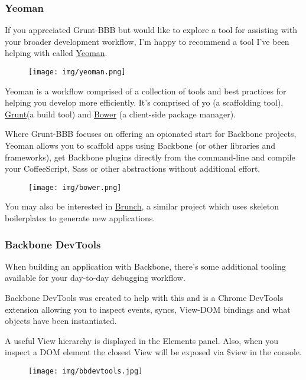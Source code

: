 \documentclass[9pt]{book}
\begin{document}
\subsubsection{Yeoman}\label{yeoman}

If you appreciated Grunt-BBB but would like to explore a tool for
assisting with your broader development workflow, I'm happy to recommend
a tool I've been helping with called \href{http://yeoman.io}{Yeoman}.

\begin{figure}[htbp]
\centering
\texttt{[image: img/yeoman.png]}
\end{figure}

Yeoman is a workflow comprised of a collection of tools and best
practices for helping you develop more efficiently. It's comprised of yo
(a scaffolding tool), \href{http://gruntjs.com}{Grunt}(a build tool) and
\href{http://bower.io}{Bower} (a client-side package manager).

Where Grunt-BBB focuses on offering an opionated start for Backbone
projects, Yeoman allows you to scaffold apps using Backbone (or other
libraries and frameworks), get Backbone plugins directly from the
command-line and compile your CoffeeScript, Sass or other abstractions
without additional effort.

\begin{figure}[htbp]
\centering
\texttt{[image: img/bower.png]}
\end{figure}

You may also be interested in \href{http://brunch.io/}{Brunch}, a
similar project which uses skeleton boilerplates to generate new
applications.

\subsubsection{Backbone DevTools}\label{backbone-devtools}

When building an application with Backbone, there's some additional
tooling available for your day-to-day debugging workflow.

Backbone DevTools was created to help with this and is a Chrome DevTools
extension allowing you to inspect events, syncs, View-DOM bindings and
what objects have been instantiated.

A useful View hierarchy is displayed in the Elements panel. Also, when
you inspect a DOM element the closest View will be exposed via \$view in
the console.

\begin{figure}[htbp]
\centering
\texttt{[image: img/bbdevtools.jpg]}
\end{figure}
\end{document}
